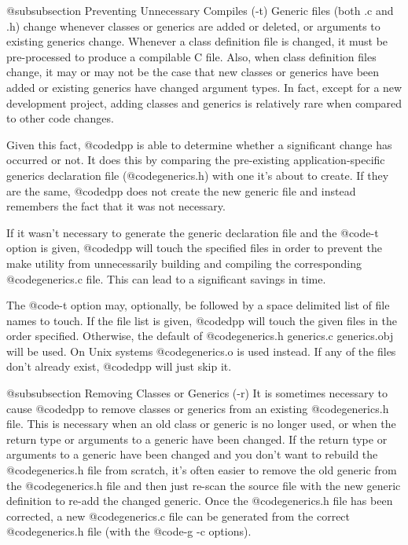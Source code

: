 @subsubsection Preventing Unnecessary Compiles (-t)
Generic files (both .c and .h) change whenever classes or generics
are added or deleted, or arguments to existing generics change.
Whenever a class definition file is changed, it must be pre-processed
to produce a compilable C file.  Also, when class definition files
change, it may or may not be the case that new classes or generics
have been added or existing generics have changed argument types.
In fact, except for a new development project, adding classes and
generics is relatively rare when compared to other code changes.

Given this fact, @code{dpp} is able to determine whether a significant
change has occurred or not.  It does this by comparing the pre-existing
application-specific generics declaration file (@code{generics.h})
with one it's about to create.  If they are the same, @code{dpp}
does not create the new generic file and instead remembers the fact
that it was not necessary.

If it wasn't necessary to generate the generic declaration file
and the @code{-t} option is given, @code{dpp} will touch the specified
files in order to prevent the make utility from unnecessarily building
and compiling the corresponding @code{generics.c} file.  This
can lead to a significant savings in time.


The @code{-t} option may, optionally, be followed by a space
delimited list of file names to touch.  If the file list is given,
@code{dpp} will touch the given files in the order specified.  Otherwise, the
default of @code{generics.h generics.c generics.obj} will be used.
On Unix systems @code{generics.o} is used instead.  If any of the
files don't already exist, @code{dpp} will just skip it.

@subsubsection Removing Classes or Generics (-r)
It is sometimes necessary to cause @code{dpp} to remove classes or
generics from an existing @code{generics.h} file.  This is necessary
when an old class or generic is no longer used, or when the return type
or arguments to a generic have been changed.  If the return type or
arguments to a generic have been changed and you don't want to rebuild
the @code{generics.h} file from scratch, it's often easier to remove the
old generic from the @code{generics.h} file and then just re-scan the
source file with the new generic definition to re-add the changed
generic.  Once the @code{generics.h} file has been corrected, a new
@code{generics.c} file can be generated from the correct
@code{generics.h} file (with the @code{-g -c} options).

